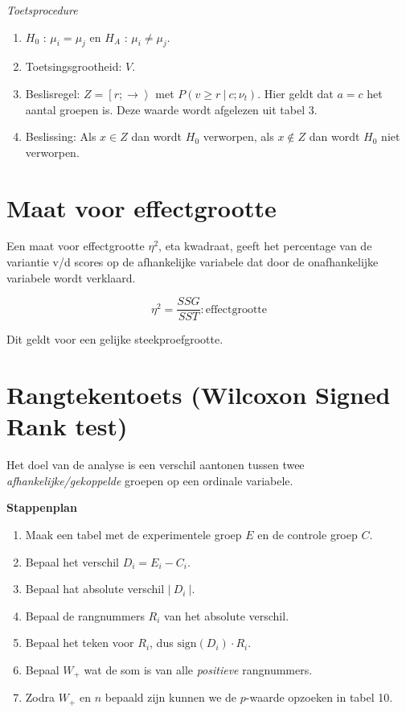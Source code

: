 \documentclass[11pt]{article}
\providecommand{\tightlist}{%
      \setlength{\itemsep}{0pt}\setlength{\parskip}{0pt}}
\begin{document}
\emph{Toetsprocedure}

\begin{enumerate}
\def\labelenumi{\arabic{enumi}.}
\tightlist
\item
  \(H_0\) : \(\mu_i = \mu_j\) en \(H_A\) : \(\mu_i \not= \mu_j\).
\item
  Toetsingsgrootheid: \(V\).
\item
  Beslisregel: \(Z = \left[r;\rightarrow\right>\) met
  \(P(v\geq r\ |\ c; \nu_t)\). Hier geldt dat \(a=c\) het aantal groepen
  is. Deze waarde wordt afgelezen uit tabel 3.
\item
  Beslissing: Als \(x \in Z\) dan wordt \(H_0\) verworpen, als
  \(x \not\in Z\) dan wordt \(H_0\) niet verworpen.
\end{enumerate}

    \hypertarget{maat-voor-effectgrootte}{%
\section{Maat voor effectgrootte}\label{maat-voor-effectgrootte}}

    Een maat voor effectgrootte \(\eta^2\), eta kwadraat, geeft het
percentage van de variantie v/d scores op de afhankelijke variabele dat
door de onafhankelijke variabele wordt verklaard.

\[ \eta^2 = \dfrac{SSG}{SST} : \textrm{effectgrootte} \]

Dit geldt voor een gelijke steekproefgrootte.

    \hypertarget{rangtekentoets-wilcoxon-signed-rank-test}{%
\section{Rangtekentoets (Wilcoxon Signed Rank
test)}\label{rangtekentoets-wilcoxon-signed-rank-test}}

    Het doel van de analyse is een verschil aantonen tussen twee
\emph{afhankelijke/gekoppelde} groepen op een ordinale variabele.

\textbf{Stappenplan}

\begin{enumerate}
\def\labelenumi{\arabic{enumi}.}
\tightlist
\item
  Maak een tabel met de experimentele groep \(E\) en de controle groep
  \(C\).
\item
  Bepaal het verschil \(D_i = E_i - C_i\).
\item
  Bepaal hat absolute verschil \(|\ D_i\ |\).
\item
  Bepaal de rangnummers \(R_i\) van het absolute verschil.
\item
  Bepaal het teken voor \(R_i\), dus \(\textrm{sign}(D_i) \cdot R_i\).
\item
  Bepaal \(W_+\) wat de som is van alle \emph{positieve} rangnummers.
\item
  Zodra \(W_+\) en \(n\) bepaald zijn kunnen we de \(p\)-waarde opzoeken
  in tabel 10.
\end{enumerate}
\end{document}
